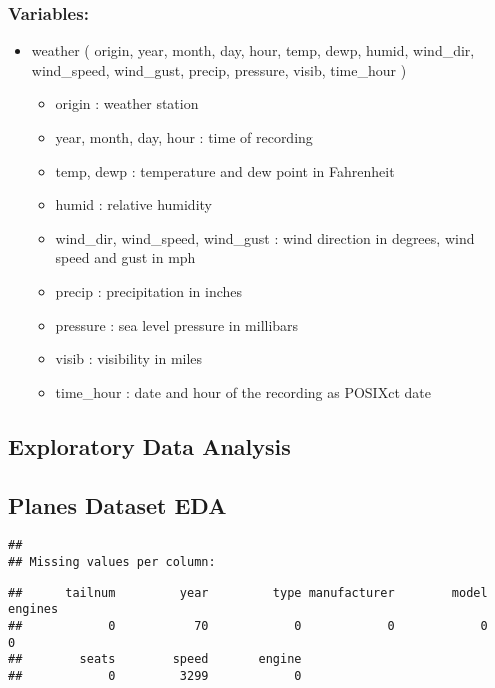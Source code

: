 \documentclass[
]{article}
\providecommand{\tightlist}{%
  \setlength{\itemsep}{0pt}\setlength{\parskip}{0pt}}
\begin{document}
\subsubsection{Variables:}\label{variables-4}

\begin{itemize}
\tightlist
\item
  weather ( origin, year, month, day, hour, temp, dewp, humid,
  wind\_dir, wind\_speed, wind\_gust, precip, pressure, visib,
  time\_hour )

  \begin{itemize}
  \tightlist
  \item
    origin : weather station
  \item
    year, month, day, hour : time of recording
  \item
    temp, dewp : temperature and dew point in Fahrenheit
  \item
    humid : relative humidity
  \item
    wind\_dir, wind\_speed, wind\_gust : wind direction in degrees, wind
    speed and gust in mph
  \item
    precip : precipitation in inches
  \item
    pressure : sea level pressure in millibars
  \item
    visib : visibility in miles
  \item
    time\_hour : date and hour of the recording as POSIXct date
  \end{itemize}
\end{itemize}

\newpage
\begin{center}
\section*{Exploratory Data Analysis}
\end{center}

\subsection{Planes Dataset EDA}\label{planes-dataset-eda}

\begin{verbatim}
## 
## Missing values per column:
\end{verbatim}

\begin{verbatim}
##      tailnum         year         type manufacturer        model      engines 
##            0           70            0            0            0            0 
##        seats        speed       engine 
##            0         3299            0
\end{verbatim}
\end{document}
